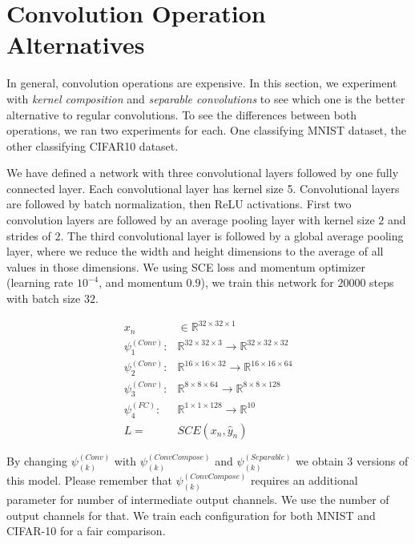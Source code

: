 \section{Convolution Operation Alternatives}
In general, convolution operations are expensive. In this section, we experiment with \textit{kernel composition} and \textit{separable convolutions} to see which one is the better alternative to regular convolutions. To see the differences between both operations, we ran two experiments for each. One classifying MNIST dataset, the other classifying CIFAR10 dataset.

We have defined a network with three convolutional layers followed by one fully connected layer. Each convolutional layer has kernel size 5. Convolutional layers are followed by batch normalization, then ReLU activations. First two convolution layers are followed by an average pooling layer with kernel size $2$ and strides of $2$. The third convolutional layer is followed by a global average pooling layer, where we reduce the width and height dimensions to the average of all values in those dimensions. We using SCE loss and momentum optimizer (learning rate $10^{-4}$, and momentum $0.9$), we train this network for $20000$ steps with batch size $32$. 

\begin{equation*}
\begin{split}
x_n &\in \mathbb{R}^{32 \times 32 \times 1}\\
\psi_1^{(Conv)}:& \mathbb{R}^{32 \times 32 \times 3} \rightarrow \mathbb{R}^{32 \times 32 \times 32} \\
\psi_2^{(Conv)}:& \mathbb{R}^{16 \times 16 \times 32} \rightarrow \mathbb{R}^{16 \times 16 \times 64} \\
\psi_3^{(Conv)}:& \mathbb{R}^{8 \times 8 \times 64} \rightarrow \mathbb{R}^{8 \times 8 \times 128} \\
\psi_4^{(FC)}:& \mathbb{R}^{1 \times 1 \times 128} \rightarrow \mathbb{R}^{10} \\
L =& SCE(x_n, \hat y_n)
\end{split}
\end{equation*}

By changing $\psi_{(k)}^{(Conv)}$ with $\psi_{(k)}^{(ConvCompose)}$ and $\psi_{(k)}^{(Separable)}$ we obtain 3 versions of this model. Please remember that $\psi_{(k)}^{(ConvCompose)}$ requires an additional parameter for number of intermediate output channels. We use the number of output channels for that. We train each configuration for both MNIST and CIFAR-10 for a fair comparison.

